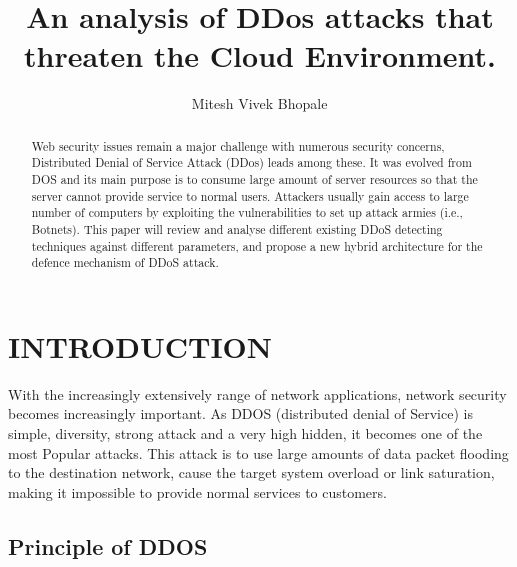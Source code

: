 \documentclass[letterpaper, 10 pt, conference]{ieeeconf}  %
\title{\LARGE \bf
An analysis of DDos attacks that threaten the Cloud Environment.
 }
\author{Mitesh Vivek Bhopale$^{}$
}
\begin{document}
\maketitle
\thispagestyle{empty}
\pagestyle{empty}


\begin{abstract}

Web security issues remain a major challenge with numerous security concerns, Distributed Denial of Service Attack (DDos) leads among these. It was evolved from DOS and its main purpose is to consume large amount of server resources so that the server cannot provide service to normal users. Attackers usually gain access to large number of computers by exploiting the vulnerabilities to set up attack armies (i.e., Botnets). This paper will review and analyse different existing DDoS detecting techniques against different parameters, and propose a new hybrid architecture for the defence mechanism of DDoS attack.

\end{abstract}


\section{INTRODUCTION}

With the increasingly extensively range of network applications, network security becomes increasingly important. As DDOS (distributed denial of Service) is simple, diversity, strong attack and a very high hidden, it becomes one of the most
Popular attacks. This attack is to use large amounts of data packet flooding to the destination network, cause the target system overload or link saturation, making it impossible to provide normal services to customers.



\subsection{ Principle of DDOS}
\end{document}
